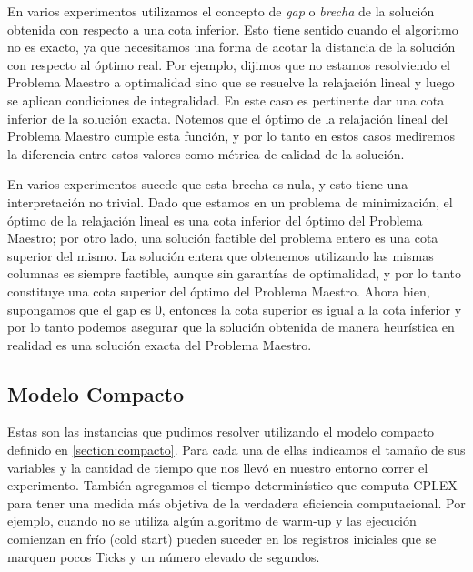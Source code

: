 En varios experimentos utilizamos el concepto de \emph{gap} o \emph{brecha} de la solución obtenida con respecto a una cota inferior. Esto tiene sentido cuando el algoritmo no es exacto, ya que necesitamos una forma de acotar la distancia de la solución con respecto al óptimo real. Por ejemplo, dijimos que no estamos resolviendo el Problema Maestro a optimalidad sino que se resuelve la relajación lineal y luego se aplican condiciones de integralidad. En este caso es pertinente dar una cota inferior de la solución exacta. Notemos que el óptimo de la relajación lineal del Problema Maestro cumple esta función, y por lo tanto en estos casos mediremos la diferencia entre estos valores como métrica de calidad de la solución. 

En varios experimentos sucede que esta brecha es nula, y esto tiene una interpretación no trivial. Dado que estamos en un problema de minimización, el óptimo de la relajación lineal es una cota inferior del óptimo del Problema Maestro; por otro lado, una solución factible del problema entero es una cota superior del mismo. La solución entera que obtenemos utilizando las mismas columnas es siempre factible, aunque sin garantías de optimalidad, y por lo tanto constituye una cota superior del óptimo del Problema Maestro. Ahora bien, supongamos que el gap es 0, entonces la cota superior es igual a la cota inferior y por lo tanto podemos asegurar que la solución obtenida de manera heurística en realidad es una solución exacta del Problema Maestro. 


\subsection{Modelo Compacto}

Estas son las instancias que pudimos resolver utilizando el modelo compacto definido en \ref{section:compacto}. Para cada una de ellas indicamos el tamaño de sus variables y la cantidad de tiempo que nos llevó en nuestro entorno correr el experimento. También agregamos el tiempo determinístico que computa CPLEX para tener una medida más objetiva de la verdadera eficiencia computacional. Por ejemplo, cuando no se utiliza algún algoritmo de warm-up y las ejecución comienzan en frío (cold start) pueden suceder en los registros iniciales que se marquen pocos Ticks y un número elevado de segundos.

